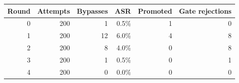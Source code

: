\begin{tabular}{rrrrrr}\toprule
Round & Attempts & Bypasses & ASR & Promoted & Gate rejections \\\midrule
0 & 200 & 1 & 0.5\% & 1 & 0 \\
1 & 200 & 12 & 6.0\% & 4 & 8 \\
2 & 200 & 8 & 4.0\% & 0 & 8 \\
3 & 200 & 1 & 0.5\% & 0 & 1 \\
4 & 200 & 0 & 0.0\% & 0 & 0 \\
\bottomrule\end{tabular}
